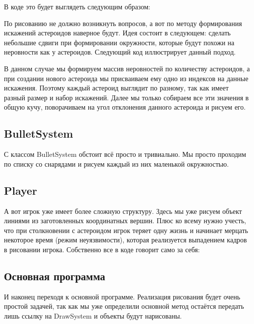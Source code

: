 В коде это будет выглядеть следующим образом:


По рисованию не должно возникнуть вопросов, а вот по методу формирования искажений 
астероидов наверное будут. Идея состоит в следующем: сделать небольшие сдвиги при 
формировании окружности, которые будут похожи на неровности как у астероидов. 
Следующий код иллюстрирует данный подход.


В данном случае мы формируем массив неровностей по количеству астероидов, а при создании 
нового астероида мы присваиваем ему одно из индексов на данные искажения. Поэтому каждый 
астероид выглядит по разному, так как имеет разный размер и набор искажений. Далее мы 
только собираем все эти значения в общую кучу, поворачиваем на угол отклонения данного 
астероида и рисуем его.

\pagebreak

\subsection{BulletSystem}
С классом BulletSystem обстоит всё просто и тривиально. Мы просто проходим по списку со 
снарядами и рисуем каждый из них маленькой окружностью.


\subsection{Player}
А вот игрок уже имеет более сложную структуру. Здесь мы уже рисуем объект линиями из 
заготовленных координатных вершин. Плюс ко всему нужно учесть, что при столкновении с 
астероидом игрок теряет одну жизнь и начинает мерцать некоторое время 
(режим неуязвимости), которая реализуется выпадением кадров в рисовании игрока. 
Собственно все в коде говорит само за себя:


\subsection{Основная программа}
И наконец переходя к основной программе. Реализация рисования будет очень простой 
задачей, так как мы уже определили основной метод остаётся передать лишь ссылку на 
DrawSystem и объекты будут нарисованы.

